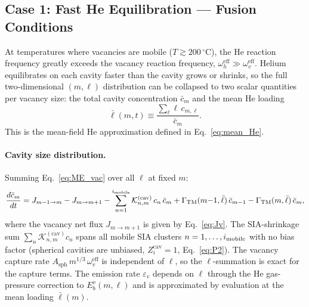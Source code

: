 \documentclass[pdflatex,sn-basic]{sn-jnl} %
\begin{document}
\subsection{Case 1: Fast He Equilibration --- Fusion Conditions}
\label{sec:case1}

At temperatures where vacancies are mobile ($T \gtrsim 200\,^\circ$C),
the He reaction frequency greatly exceeds the vacancy reaction
frequency, $\omega_h^{\mathrm{eff}} \gg \omega_v^{\mathrm{eff}}$.
Helium equilibrates on each cavity faster than the cavity grows or
shrinks, so the full two-dimensional $(m,\ell)$ distribution can be
collapsed to two scalar quantities per vacancy size: the total cavity
concentration $\bar{c}_m$ and the mean He loading
\begin{equation}\label{eq:lbar_def}
    \bar{\ell}(m,t)
    \equiv \frac{\sum_\ell \ell\,c_{m,\ell}}{\bar{c}_m}.
\end{equation}
This is the mean-field He approximation defined in
Eq.~\eqref{eq:mean_He}.

\paragraph{Cavity size distribution.}
Summing Eq.~\eqref{eq:ME_vac} over all $\ell$ at fixed $m$:
\begin{equation}\label{eq:case1_cm}
    \frac{d\bar{c}_m}{dt}
    = J_{m-1 \to m} - J_{m \to m+1}
    - \sum_{n=1}^{i_{\rm mobile}}
      \mathcal{K}_{n,m}^{(\mathrm{cav})}\,c_n\,\bar{c}_m
    + \Gamma_{\mathrm{TM}}(m{-}1,\bar{\ell})\,\bar{c}_{m-1}
    - \Gamma_{\mathrm{TM}}(m,\bar{\ell})\,\bar{c}_m,
\end{equation}
where the vacancy net flux $J_{m\to m+1}$ is given by
Eq.~\eqref{eq:Jv}. The SIA-shrinkage sum $\sum_n
\mathcal{K}_{n,m}^{(\mathrm{cav})} c_n$ spans all mobile SIA clusters
$n = 1,\ldots,i_{\rm mobile}$ with no bias factor (spherical cavities are
unbiased, $Z_i^{\mathrm{cav}} = 1$, Eq.~\ref{eq:P2}). The vacancy
capture rate $A_{\mathrm{sph}}\,m^{1/3}\,\omega_v^{\mathrm{eff}}$ is
independent of $\ell$, so the $\ell$-summation is exact for the capture
terms. The emission rate $\varepsilon_v$ depends on $\ell$ through the
He gas-pressure correction to $E_b^v(m,\ell)$ and is approximated by
evaluation at the mean loading $\bar{\ell}(m)$.
\end{document}
